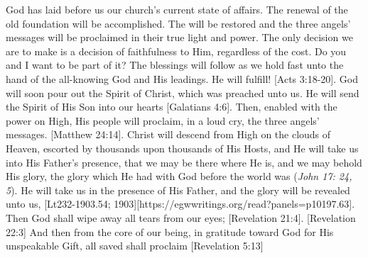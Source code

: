 God has laid before us our church’s current state of affairs. The renewal of the old foundation will be accomplished. The  will be restored and the three angels’ messages will be proclaimed in their true light and power. The only decision we are to make is a decision of faithfulness to Him, regardless of the cost. Do you and I want to be part of it? The blessings will follow as we hold fast unto the hand of the all-knowing God and His leadings.  He will fulfill! [Acts 3:18-20]. God will soon pour out the Spirit of Christ, which was preached unto us. He will send the Spirit of His Son into our hearts [Galatians 4:6].  Then, enabled with the power on High, His people will proclaim, in a loud cry, the three angels’ messages. [Matthew 24:14]. Christ will descend from High on the clouds of Heaven, escorted by thousands upon thousands of His Hosts, and He will take us into His Father’s presence, that we may be there where He is, and we may behold His glory, the glory which He had with God before the world was (\textit{John 17: 24, 5}). He will take us in the presence of His Father, and the glory will be revealed unto us, [Lt232-1903.54; 1903][https://egwwritings.org/read?panels=p10197.63]. Then God shall wipe away all tears from our eyes; [Revelation 21:4]. [Revelation 22:3] And then from the core of our being, in gratitude toward God for His unspeakable Gift, all saved  shall proclaim [Revelation 5:13]


